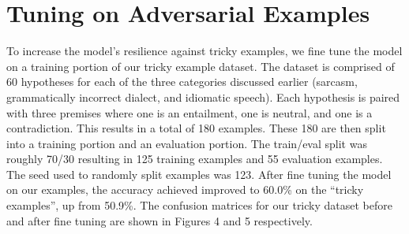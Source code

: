 \documentclass{article}
\begin{document}
\section{Tuning on Adversarial Examples}
To increase the model's resilience against tricky examples, we fine tune the model on a training portion of our
tricky example dataset. The dataset is comprised of 60 hypotheses for each of the three categories discussed earlier (sarcasm,
grammatically incorrect dialect, and idiomatic speech). Each hypothesis is paired with three premises where one is an entailment,
one is neutral, and one is a contradiction. This results in a total of 180 examples. These 180 are then split into a training
portion and an evaluation portion. The train/eval split was roughly 70/30 resulting in 125 training examples and 55 evaluation
examples. The seed used to randomly split examples was 123. After fine tuning the model on our examples, the accuracy
achieved improved to 60.0\% on the “tricky examples”, up from 50.9\%. The confusion matrices for our tricky dataset before and
after fine tuning are shown in Figures 4 and 5 respectively.
\end{document}

